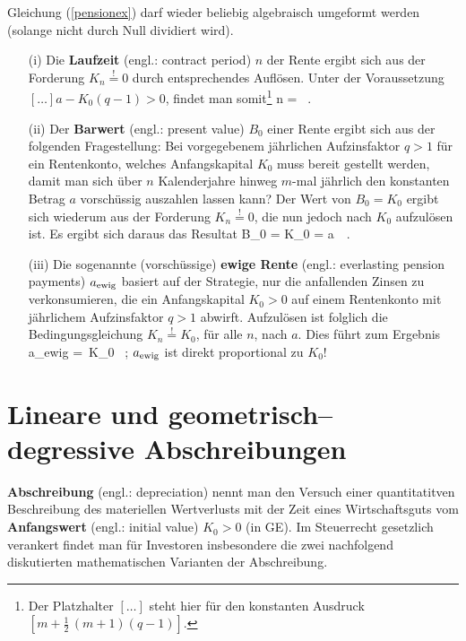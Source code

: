 \medskip
\noindent
Gleichung (\ref{pensionex}) darf wieder beliebig algebraisch
umgeformt werden (solange nicht durch Null dividiert wird).
%
\begin{itemize}

\item[(i)] Die {\bf Laufzeit} (engl.: contract period) $n$ der 
Rente ergibt sich aus der
Forderung $K_{n}\stackrel{!}{=}0$ durch entsprechendes Aufl\"osen.
Unter der Voraussetzung $[\ldots]a-K_{0}(q-1)>0$, findet man
somit\footnote{Der Platzhalter $[\ldots]$ steht hier f\"ur den
konstanten Ausdruck $\left[m+\frac{1}{2}\,(m+1)(q-1)\right]$.}
%
\be
{}
n =  \ .
\ee
%

\item[(ii)] Der {\bf Barwert} (engl.: present value) $B_{0}$ einer 
Rente ergibt sich aus der folgenden Fragestellung: Bei 
vorgegebenem j\"ahrlichen Aufzinsfaktor $q>1$ f\"ur ein 
Rentenkonto, welches Anfangskapital $K_{0}$ muss bereit gestellt 
werden, damit man sich \"uber $n$ Kalenderjahre hinweg $m$-mal 
j\"ahrlich den konstanten Betrag $a$ vorsch\"ussig auszahlen 
lassen kann?
Der Wert von $B_{0}=K_{0}$ ergibt sich wiederum aus der
Forderung $K_{n}\stackrel{!}{=}0$, die nun jedoch nach $K_{0}$
aufzul\"osen ist. Es ergibt sich daraus das Resultat
%
\be
{}
B_{0} = K_{0} = a\,
 \ .
\ee
%

\item[(iii)] Die sogenannte (vorsch\"ussige) {\bf ewige Rente}
(engl.: everlasting pension payments) $a_{\rm ewig}$ basiert auf 
der Strategie, nur die anfallenden
Zinsen zu verkonsumieren, die ein Anfangskapital $K_{0}>0$ auf
einem Rentenkonto mit j\"ahrlichem Aufzinsfaktor $q>1$ abwirft.
Aufzul\"osen ist folglich die Bedingungsgleichung
$K_{n}\stackrel{!}{=}K_{0}$, f\"ur alle $n$, nach $a$. Dies
f\"uhrt zum Ergebnis
%
\be
a_{\rm ewig} = \,K_{0} \ ;
\ee
%
$a_{\rm ewig}$ ist direkt proportional zu $K_{0}$!

\end{itemize}
%

\section[Lineare und geometrisch--degressive Abschreibungen]%
{Lineare und geometrisch--degressive Abschreibungen}
{\bf Abschreibung} (engl.: depreciation) nennt man den Versuch 
einer quantitatitven Beschreibung des materiellen Wertverlusts mit 
der Zeit eines Wirtschaftsguts vom {\bf Anfangswert} (engl.: 
initial value) $K_{0}>0$ (in GE). Im Steuerrecht gesetzlich 
verankert findet man f\"ur Investoren insbesondere die zwei 
nachfolgend diskutierten mathematischen Varianten der Abschreibung.

